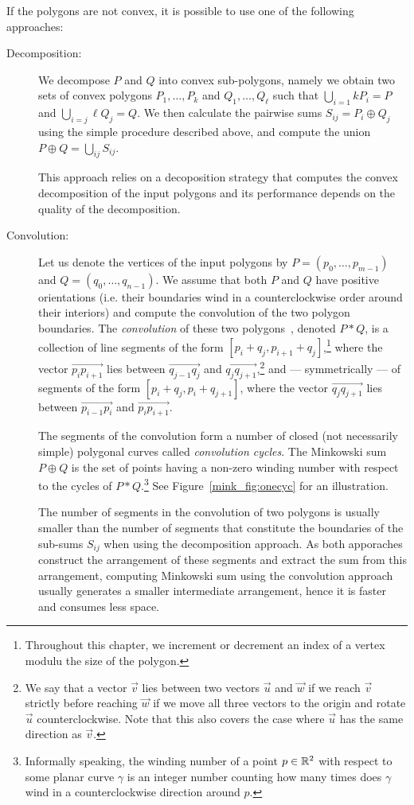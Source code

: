 If the polygons are not convex, it is possible to use one of the following
approaches:
\begin{description}
\item[Decomposition:]
We decompose $P$ and $Q$ into convex sub-polygons, namely we obtain two
sets of convex polygons $P_1, \ldots, P_k$ and $Q_1, \ldots, Q_\ell$ such
that $\bigcup_{i = 1}{k}{P_i} = P$ and $\bigcup_{i = j}{\ell}{Q_j} = Q$.
We then calculate the pairwise sums $S_{ij} = P_i \oplus Q_j$ using the
simple procedure described above, and compute the union $P \oplus Q =
\bigcup_{ij}{S_{ij}}$.

This approach relies on a decoposition strategy that computes the convex
decomposition of the input polygons and its performance depends on the
quality of the decomposition.
%
\item[Convolution:]
Let us denote the vertices of the input polygons by
$P = \left( p_0, \ldots, p_{m-1} \right)$ and
$Q = \left( q_0, \ldots, q_{n-1} \right)$. We assume that both $P$ and $Q$
have positive orientations (i.e. their boundaries wind in a counterclockwise
order around their interiors) and compute the convolution of the two polygon
boundaries. The {\em convolution} of these two polygons~\cite{grs-kfcg-83},
denoted $P * Q$, is a collection of line segments of the form
$[p_i + q_j, p_{i+1} + q_j]$,\footnote{Throughout this chapter, we increment
or decrement an index of a vertex modulu the size of the polygon.}
where the vector $\overrightarrow{p_i p_{i+1}}$
lies between $\overrightarrow{q_{j-1} q_j}$ and $\overrightarrow{q_j
q_{j+1}}$,\footnote{We say that a vector $\vec{v}$ lies between
two vectors $\vec{u}$ and $\vec{w}$ if we reach $\vec{v}$ strictly
before reaching $\vec{w}$ if we move all three vectors to the origin
and rotate $\vec{u}$ counterclockwise. Note that this also covers
the case where $\vec{u}$ has the same direction as $\vec{v}$.} and
--- symmetrically --- of segments of the form $[p_i + q_j, p_i + q_{j+1}]$,
where the vector $\overrightarrow{q_j q_{j+1}}$ lies between
$\overrightarrow{p_{i-1} p_i}$ and $\overrightarrow{p_i p_{i+1}}$.

The segments of the convolution form a number of closed (not
necessarily simple) polygonal curves called \emph{convolution
cycles}. The Minkowski sum $P \oplus Q$ is the set of points
having a non-zero winding number with respect to the cycles
of $P * Q$.\footnote{Informally speaking, the winding number of a point
$p \in \mathbb{R}^2$ with respect to some planar curve $\gamma$ is an
integer number counting how many times does $\gamma$ wind in a
counterclockwise direction around $p$.} See Figure~\ref{mink_fig:onecyc}
for an illustration.

The number of segments in the convolution of two polygons is usually
smaller than the number of segments that constitute the boundaries of the
sub-sums $S_{ij}$ when using the decomposition approach. As both apporaches
construct the arrangement of these segments and extract the sum from this
arrangement, computing Minkowski sum using the convolution approach usually
generates a smaller intermediate arrangement, hence it is faster and
consumes less space.
\end{description}

